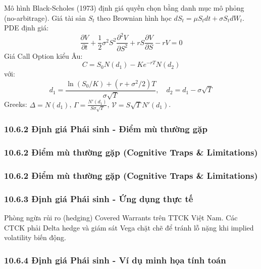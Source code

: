 \documentclass[
]{article}
\begin{document}
Mô hình Black-Scholes (1973) định giá quyền chọn bằng danh mục mô phỏng
(no-arbitrage). Giá tài sản \(S_t\) theo Brownian hình học
\(dS_t = \mu S_t dt + \sigma S_t dW_t\). PDE định giá:
\[ \frac{\partial V}{\partial t} + \frac{1}{2}\sigma^2 S^2 \frac{\partial^2 V}{\partial S^2} + r S \frac{\partial V}{\partial S} - rV = 0 \]
Giá Call Option kiểu Âu: \[ C = S_0 N(d_1) - K e^{-rT} N(d_2) \] với:
\[ d_1 = \frac{\ln(S_0/K) + (r + \sigma^2/2)T}{\sigma \sqrt{T}}, \quad d_2 = d_1 - \sigma \sqrt{T} \]
Greeks: \(\Delta = N(d_1)\),
\(\Gamma = \frac{N'(d_1)}{S \sigma \sqrt{T}}\),
\(\mathcal{V} = S \sqrt{T} N'(d_1)\).

\subsubsection{10.6.2 Định giá Phái sinh - Điểm mù thường
gặp}\label{ux111ux1ecbnh-giuxe1-phuxe1i-sinh---ux111iux1ec3m-muxf9-thux1b0ux1eddng-gux1eb7p}

\subsubsection{10.6.2 Điểm mù thường gặp (Cognitive Traps \&
Limitations)}\label{ux111iux1ec3m-muxf9-thux1b0ux1eddng-gux1eb7p-cognitive-traps-limitations-86}

\subsubsection{10.6.2 Điểm mù thường gặp (Cognitive Traps \&
Limitations)}\label{ux111iux1ec3m-muxf9-thux1b0ux1eddng-gux1eb7p-cognitive-traps-limitations-87}

\subsubsection{10.6.3 Định giá Phái sinh - Ứng dụng thực
tế}\label{ux111ux1ecbnh-giuxe1-phuxe1i-sinh---ux1ee9ng-dux1ee5ng-thux1ef1c-tux1ebf}

Phòng ngừa rủi ro (hedging) Covered Warrants trên TTCK Việt Nam. Các
CTCK phải Delta hedge và giám sát Vega chặt chẽ để tránh lỗ nặng khi
implied volatility biến động.

\subsubsection{10.6.4 Định giá Phái sinh - Ví dụ minh họa tính
toán}\label{ux111ux1ecbnh-giuxe1-phuxe1i-sinh---vuxed-dux1ee5-minh-hux1ecda-tuxednh-touxe1n}
\end{document}
